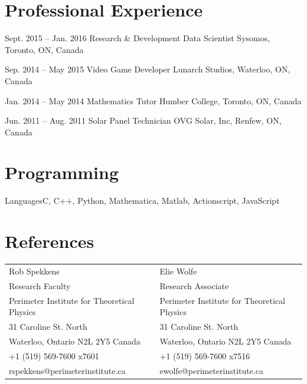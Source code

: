 \documentclass[10pt]{article}
\begin{document}
    \section{Professional Experience}
    \begin{experiencelist}
        \item{Sept. 2015 -- Jan. 2016}
            {Research \& Development Data Scientist}
            {Sysomos, Toronto, ON, Canada}
            {}
        \item{Sep. 2014 -- May 2015}
            {Video Game Developer}
            {Lunarch Studios, Waterloo, ON, Canada}
            {}
        \item{Jan. 2014 -- May 2014}
            {Mathematics Tutor}
            {Humber College, Toronto, ON, Canada}
            {}
        \item{Jun. 2011 -- Aug. 2011}
            {Solar Panel Technician}
            {OVG Solar, Inc, Renfew, ON, Canada}
            {}
    \end{experiencelist}
    \section{Programming}
    \begin{computerlist}
        \item{Languages}{C, C++, Python, Mathematica, Matlab, Actionscript, JavaScript}
    \end{computerlist}
    \clearpage
    \section{References}
    \begin{tabularx}{\textwidth}{X X}
        Rob Spekkens                                & Elie Wolfe \\
        Research Faculty                            & Research Associate \\
        Perimeter Institute for Theoretical Physics & Perimeter Institute for Theoretical Physics \\
        31 Caroline St. North                       & 31 Caroline St. North \\
        Waterloo, Ontario N2L 2Y5 Canada            & Waterloo, Ontario N2L 2Y5 Canada \\
        +1 (519) 569-7600 x7601                     & +1 (519) 569-7600 x7516 \\
        rspekkens@perimeterinstitute.ca             & ewolfe@perimeterinstitute.ca \\
    \end{tabularx}
\end{document}
